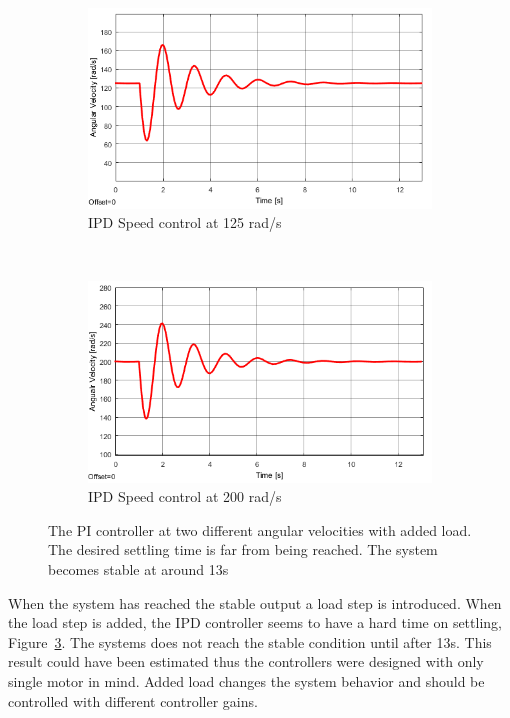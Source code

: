 \begin{figure}[h!]
	\centering
	\begin{subfigure}[b]{0.45\textwidth}
		\includegraphics[width=\textwidth]{graphics/IPD_load125}
		\caption{IPD Speed control at 125 rad/s}
		\label{fig:ipdload125}
	\end{subfigure}
	~ %
	\begin{subfigure}[b]{0.45\textwidth}
		\includegraphics[width=\textwidth]{graphics/IPD_load200}
		\caption{IPD Speed control at 200 rad/s}
		\label{fig:ipdload200}
	\end{subfigure}
	\caption{The PI controller at two different angular velocities with added load. The desired settling time is far from being reached. The system becomes stable at around 13s}
	\label{fig:ipdload}
\end{figure}

When the system has reached the stable output a load step is introduced.
When the load step is added, the IPD controller seems to have a hard time on settling, Figure~\ref{fig:ipdload}. The systems does not reach the stable condition until after 13s. This result could have been estimated thus the controllers were designed with only single motor in mind. Added load changes the system behavior and should be controlled with different controller gains.
